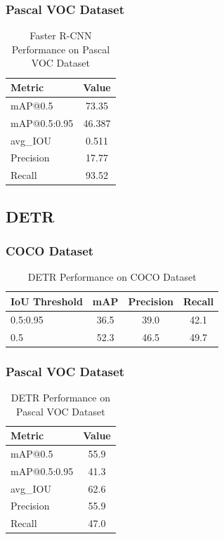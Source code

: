 \documentclass[12pt,a4paper]{article}
\begin{document}
\subsubsection{Pascal VOC Dataset}
\begin{table}[H]
    \centering
    \caption{Faster R-CNN Performance on Pascal VOC Dataset}
    \begin{tabular}{lc}
        \toprule
        \textbf{Metric} & \textbf{Value} \\
        \midrule
        mAP@0.5        & 73.35  \\
        mAP@0.5:0.95   & 46.387  \\
        avg\_IOU        & 0.511   \\
        Precision      & 17.77\\
        Recall         & 93.52 \\
        \bottomrule
    \end{tabular}
\end{table}

\subsection{DETR}

\subsubsection{COCO Dataset}
\begin{table}[H]
    \centering
    \caption{DETR Performance on COCO Dataset}
    \begin{tabular}{lccc}
        \toprule
        \textbf{IoU Threshold} & \textbf{mAP} & \textbf{Precision} & \textbf{Recall} \\
        \midrule
        0.5:0.95 & 36.5 & 39.0 & 42.1 \\
        0.5      & 52.3 & 46.5 & 49.7 \\
        \bottomrule
    \end{tabular}
\end{table}

\subsubsection{Pascal VOC Dataset}
\begin{table}[H]
    \centering
    \caption{DETR Performance on Pascal VOC Dataset}
    \begin{tabular}{lc}
        \toprule
        \textbf{Metric} & \textbf{Value} \\
        \midrule
        mAP@0.5        & 55.9  \\
        mAP@0.5:0.95   & 41.3  \\
        avg\_IOU       & 62.6    \\
        Precision      & 55.9    \\
        Recall         & 47.0  \\
        \bottomrule
    \end{tabular}
\end{table}
\end{document}
